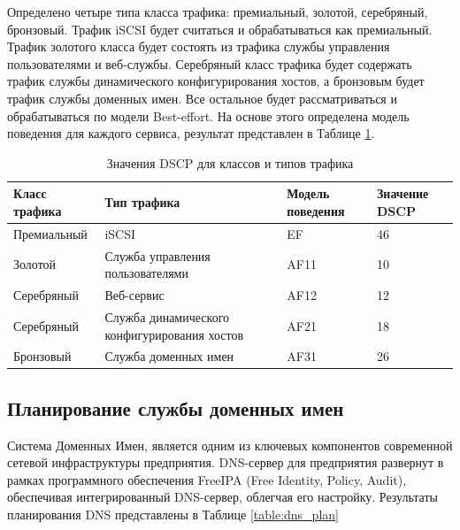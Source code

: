 \documentclass[14pt, a4paper]{extarticle}
\numberwithin{equation}{section}
\begin{document}
Определено четыре типа класса трафика: премиальный, золотой, серебряный, бронзовый. 
Трафик iSCSI будет считаться и обрабатываться как премиальный. Трафик золотого класса будет состоять 
из трафика службы управления пользователями и веб-службы. 
Серебряный класс трафика будет содержать трафик службы динамического конфигурирования хостов, а 
бронзовым будет трафик службы доменных имен. Все остальное будет рассматриваться и обрабатываться по модели Best-effort.
На основе этого определена модель поведения для каждого сервиса, результат представлен в Таблице \ref{table:qos}.

\begin{table}[H]
\centering
\small
\caption{Значения DSCP для классов и типов трафика}
\label{table:qos}
\begin{tabular}{|m{3cm}|m{3.5cm}|m{3cm}|m{3cm}|}
\hline
\textbf{Класс трафика} & \textbf{Тип трафика} & \textbf{Модель поведения} & \textbf{Значение DSCP} \\
\hline
Премиальный & iSCSI & EF & 46 \\
\hline
Золотой & Служба управления пользователями & AF11 & 10 \\
\hline
Серебряный & Веб-сервис & AF12 & 12 \\
\hline
Серебряный & Служба динамического конфигурирования хостов & AF21 & 18 \\
\hline
Бронзовый & Служба доменных имен & AF31 & 26 \\
\hline
\end{tabular}
\end{table}



\subsection{Планирование службы доменных имен}
Система Доменных Имен, является одним из ключевых компонентов современной 
сетевой инфраструктуры предприятия. 
DNS-сервер для предприятия развернут в рамках программного
обеспечения FreeIPA (Free Identity, Policy, Audit), обеспечивая интегрированный
DNS-сервер, облегчая его настройку.
Результаты планирования DNS представлены в Таблице \ref{table:dns_plan}
\end{document}
